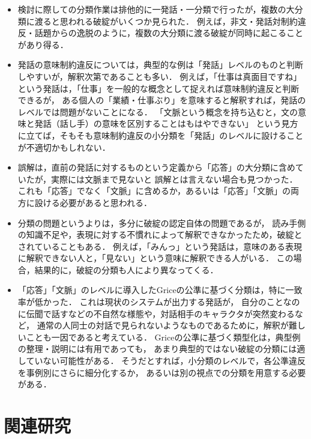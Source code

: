 \documentclass[japanese]{jnlp_1.4}
\begin{document}
\begin{itemize}
\item 検討に際しての分類作業は排他的に一発話・一分類で行ったが，複数の大分類に渡ると思われる破綻がいくつか見られた．
例えば，非文・発話対制約違反・話題からの逸脱のように，複数の大分類に渡る破綻が同時に起こることがあり得る．

\item 発話の意味制約違反については，典型的な例は「発話」レベルのものと判断しやすいが，解釈次第であることも多い．
例えば，「仕事は真面目ですね」という発話は，「仕事」を一般的な概念として捉えれば意味制約違反と判断できるが，
ある個人の「業績・仕事ぶり」を意味すると解釈すれば，発話のレベルでは問題がないことになる．
「文脈という概念を持ち込むと，文の意味と発話（話し手）の意味を区別することはもはやできない\cite{Levinson00}」
という見方に立てば，そもそも意味制約違反の小分類を「発話」のレベルに設けることが不適切かもしれない．

\item 誤解は，直前の発話に対するものという定義から「応答」の大分類に含めていたが，実際には文脈まで見ないと
誤解とは言えない場合も見つかった．
これも「応答」でなく「文脈」に含めるか，あるいは「応答」「文脈」の両方に設ける必要があると思われる．

\item 分類の問題というよりは，多分に破綻の認定自体の問題であるが，
読み手側の知識不足や，表現に対する不慣れによって解釈できなかったため，破綻とされていることもある．
例えば，「みんっ」という発話は，意味のある表現に解釈できない人と，「見ない」という意味に解釈できる人がいる．
この場合，結果的に，破綻の分類も人により異なってくる．

\item 「応答」「文脈」のレベルに導入したGriceの公準に基づく分類は，特に一致率が低かった．
これは現状のシステムが出力する発話が，
自分のことなのに伝聞で話すなどの不自然な様態や，対話相手のキャラクタが突然変わるなど，
通常の人同士の対話で見られないようなものであるために，解釈が難しいことも一因であると考えている．
Griceの公準に基づく類型化は，典型例の整理・説明には有用であっても，
あまり典型的ではない破綻の分類には適していない可能性がある．
そうだとすれば，小分類のレベルで，各公準違反を事例別にさらに細分化するか，
あるいは別の視点での分類を用意する必要がある．
\end{itemize}


\section{関連研究}
\label{sec:relatedwork}
\end{document}
